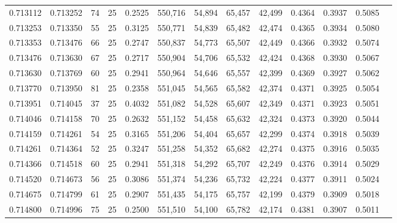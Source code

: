 \begin{tabular}{rrrrrrrrrrrrr}
0.713112 & 0.713252 &    74 &  25 &                                     0.2525 & 550,716 &  54,894 &  65,457 &  42,499 & 0.4364 & 0.3937 & 0.5085 \\
0.713253 & 0.713350 &    55 &  25 &                                     0.3125 & 550,771 &  54,839 &  65,482 &  42,474 & 0.4365 & 0.3934 & 0.5080 \\
0.713353 & 0.713476 &    66 &  25 &                                     0.2747 & 550,837 &  54,773 &  65,507 &  42,449 & 0.4366 & 0.3932 & 0.5074 \\
0.713476 & 0.713630 &    67 &  25 &                                     0.2717 & 550,904 &  54,706 &  65,532 &  42,424 & 0.4368 & 0.3930 & 0.5067 \\
0.713630 & 0.713769 &    60 &  25 &                                     0.2941 & 550,964 &  54,646 &  65,557 &  42,399 & 0.4369 & 0.3927 & 0.5062 \\
0.713770 & 0.713950 &    81 &  25 &                                     0.2358 & 551,045 &  54,565 &  65,582 &  42,374 & 0.4371 & 0.3925 & 0.5054 \\
0.713951 & 0.714045 &    37 &  25 &                                     0.4032 & 551,082 &  54,528 &  65,607 &  42,349 & 0.4371 & 0.3923 & 0.5051 \\
0.714046 & 0.714158 &    70 &  25 &                                     0.2632 & 551,152 &  54,458 &  65,632 &  42,324 & 0.4373 & 0.3920 & 0.5044 \\
0.714159 & 0.714261 &    54 &  25 &                                     0.3165 & 551,206 &  54,404 &  65,657 &  42,299 & 0.4374 & 0.3918 & 0.5039 \\
0.714261 & 0.714364 &    52 &  25 &                                     0.3247 & 551,258 &  54,352 &  65,682 &  42,274 & 0.4375 & 0.3916 & 0.5035 \\
0.714366 & 0.714518 &    60 &  25 &                                     0.2941 & 551,318 &  54,292 &  65,707 &  42,249 & 0.4376 & 0.3914 & 0.5029 \\
0.714520 & 0.714673 &    56 &  25 &                                     0.3086 & 551,374 &  54,236 &  65,732 &  42,224 & 0.4377 & 0.3911 & 0.5024 \\
0.714675 & 0.714799 &    61 &  25 &                                     0.2907 & 551,435 &  54,175 &  65,757 &  42,199 & 0.4379 & 0.3909 & 0.5018 \\
0.714800 & 0.714996 &    75 &  25 &                                     0.2500 & 551,510 &  54,100 &  65,782 &  42,174 & 0.4381 & 0.3907 & 0.5011 \\

\end{tabular}
